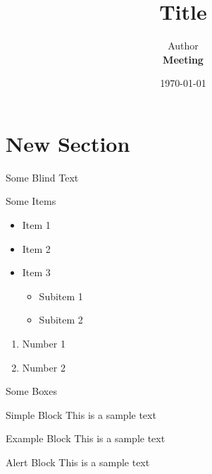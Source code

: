 \documentclass[numbering=fraction]{beamer}
\title{Title}
\author[Author]{Author\\\textbf{Meeting}}
\institute{Bergische Universität Wuppertal}
\date{\today{}}
\begin{document}
\begin{frame}[plain]{}
    \maketitle
\end{frame}

\section{New Section}

\begin{frame}{Some Blind Text}
    \blindtext
\end{frame}

\begin{frame}{Some Items}
    \begin{itemize}
        \item Item 1
        \item Item 2
        \item Item 3
        \begin{itemize}
            \item Subitem 1
            \item Subitem 2
        \end{itemize}
    \end{itemize}

    \begin{enumerate}
        \item Number 1
        \item Number 2
    \end{enumerate}
\end{frame}

\begin{frame}{Some Boxes}
    \begin{block}{Simple Block}
        This is a sample text
    \end{block}
    \begin{exampleblock}{Example Block}
        This is a sample text
    \end{exampleblock}
    \begin{alertblock}{Alert Block}
        This is a sample text
    \end{alertblock}
\end{frame}
\end{document}
